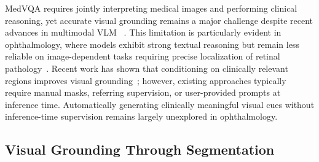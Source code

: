 \documentclass[runningheads]{llncs}
\newcommand{\todo}[1]{\textcolor{red}{\textbf{[TODO: #1]}}}
\begin{document}

\gls{MedVQA} requires jointly interpreting medical images and performing clinical reasoning, yet accurate visual grounding remains a major challenge despite recent advances in multimodal \gls{VLM} ~\cite{lin2023medvqa_survey,pellegrini2024vlm_review}. This limitation is particularly evident in ophthalmology, where models exhibit strong textual reasoning but remain less reliable on image-dependent tasks requiring precise localization of retinal pathology~\cite{thirunavukarasu2024llm_ophthalm}. Recent work has shown that conditioning on clinically relevant regions improves visual grounding~\cite{du2026care}; however, existing approaches typically require manual masks, referring supervision, or user-provided prompts at inference time. Automatically generating clinically meaningful visual cues without inference-time supervision remains largely unexplored in ophthalmology.

\subsection{Visual Grounding Through Segmentation}
\label{subsec:grounding}

\end{document}
